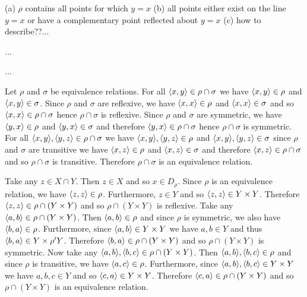 \documentclass[11pt]{book}
\begin{document}
\renewcommand{\labelenumi}{1.7.\arabic{enumi}}
\begin{enumerate}
{(a) $\rho$ contains all points for which $y=x$ (b)  all points either exist on the line $y=x$ or have a complementary point reflected about $y=x$ (c) how to describe??...}

{...}

{...}

{Let $\rho$ and $\sigma$ be equivalence relations. For all $\langle x,y\rangle\in \rho \cap \sigma$ we have $\langle x,y\rangle\in\rho$ and $\langle x,y\rangle\in\sigma$. Since $\rho$ and $\sigma$ are reflexive, we have $\langle x,x\rangle\in\rho$ and $\langle x,x\rangle\in\sigma$ and so $\langle x,x\rangle\in\rho\cap\sigma$ hence $\rho \cap \sigma$ is reflexive. Since $\rho$ and $\sigma$ are symmetric, we have $\langle y,x\rangle\in\rho$ and $\langle y,x\rangle\in\sigma$ and therefore $\langle y,x\rangle\in\rho\cap\sigma$ hence $\rho \cap \sigma$ is symmetric. For all $\langle x,y\rangle,\langle y,z\rangle\in \rho \cap \sigma$ we have $\langle x,y\rangle,\langle y,z\rangle\in\rho$ and $\langle x,y\rangle,\langle y,z\rangle\in\sigma$ since $\rho$ and $\sigma$ are transitive we have $\langle x,z\rangle\in\rho$ and $\langle x,z\rangle\in\sigma$ and therefore $\langle x,z\rangle\in\rho \cap \sigma$ and so $\rho \cap \sigma$ is transitive. Therefore $\rho \cap \sigma$ is an equivalence relation.}

{Take any $z\in X\cap Y$. Then $z\in X$ and so $x\in D_{\rho}$. Since $\rho$ is an equivalence relation, we have $\langle z,z\rangle\in\rho$. Furthermore, $z\in Y$ and so $\langle z,z\rangle\in Y\times Y$. Therefore $\langle z,z\rangle\in\rho \cap (Y \times Y)$ and so $\rho \cap (Y \times Y)$ is reflexive. Take any $\langle a,b\rangle\in\rho \cap (Y \times Y)$. Then $\langle a,b\rangle\in\rho$ and since $\rho$ is symmetric, we also have $\langle b,a\rangle\in\rho$. Furthermore, since $\langle a,b\rangle\in Y\times Y$ we have $a,b\in Y$ and thus $\langle b,a\rangle\in Y\times\rho' Y$. Therefore $\langle b,a\rangle\in\rho \cap (Y \times Y)$ and so $\rho \cap (Y \times Y)$ is symmetric. Now take any $\langle a,b\rangle,\langle b,c\rangle\in\rho \cap (Y \times Y)$. Then $\langle a,b\rangle,\langle b,c\rangle \in \rho$ and since $\rho$ is transitive, we have $\langle a,c\rangle\in\rho$. Furthermore, since $\langle a,b\rangle,\langle b,c\rangle\in Y\times Y$ we have $a,b,c\in Y$ and so $\langle c,a\rangle\in Y\times Y$. Therefore $\langle c,a\rangle\in\rho \cap (Y \times Y)$ and so $\rho \cap (Y \times Y)$ is an equivalence relation.}


\end{enumerate}
\end{document}
